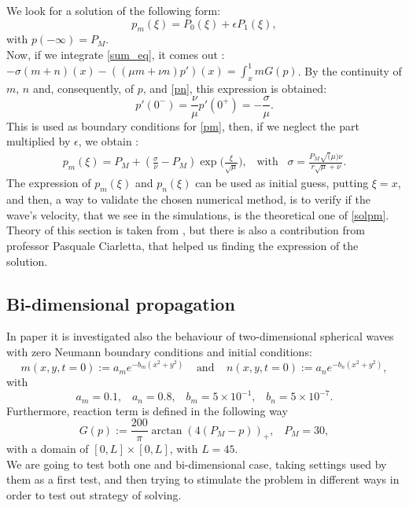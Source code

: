 We look for a solution of the following form: 
\begin{equation}
\label{pm}
p_m(\xi) = P_0(\xi) + \epsilon  P_1 (\xi),
\end{equation}
with $ p(-\infty) = P_M $.\\
Now, if we integrate \eqref{sum_eq}, it comes out : $ -\sigma (m + n) (x) - ((\mu m + \nu n) p')(x) = \int^{1}_{x} mG(p)$. By the continuity of $ m $, $ n $ and, consequently, of $ p $, and \eqref{pn}, this expression is obtained:
\begin{equation*}
p'(0^-) = \frac{\nu}{\mu} p'(0^+)=-\frac{\sigma}{\mu}.
\end{equation*} 
This is used as boundary conditions for \eqref{pm}, then, if we neglect the part multiplied by $ \epsilon $, we obtain :
\begin{eqnarray}
\label{solpm}
p_m(\xi) = P_M + (\frac{\sigma}{\nu} - P_M) \exp \Big({\frac{\xi}{\sqrt{\mu}}}\Big), \; \; \; \text{with} \; \; \;
\sigma = \frac{P_M \sqrt(\mu) \nu}{r\sqrt{\mu} + \nu}.
\end{eqnarray}
The expression of $ p_m(\xi) $ and $ p_n(\xi) $ can be used as initial guess, putting $ \xi = x $, and then, a way to validate the chosen numerical method, is to verify if the wave's velocity, that we see in the simulations, is the theoretical one of \eqref{solpm}.
Theory of this section is taken from \cite{tumor_growth}, but there is also a contribution from professor Pasquale Ciarletta, that helped us finding the expression of the solution.\\
\subsection{Bi-dimensional propagation}
In paper \cite{tumor_growth} it is investigated also the behaviour of two-dimensional spherical waves with zero Neumann boundary conditions and initial conditions:
\begin{equation*}
m(x,y,t=0) := a_m e^{-b_m (x^2 + y^2)} \; \; \; \; \text{and}\; \; \; \; n(x,y,t=0) := a_n e^{-b_n (x^2 + y^2)} ,
\end{equation*}
with 
\begin{equation*}
a_m = 0.1, \; \; \; a_n =0.8, \; \;\; b_m = 5 \times 10^{-1}, \; \; \; b_n = 5 \times 10^{-7}.
\end{equation*}
Furthermore, reaction term is defined in the following way 
\begin{equation*}
G(p):= \frac{200}{\pi}\arctan(4(P_M-p))_+, \;\;\; P_M = 30,
\end{equation*}
with a domain of  $[0, L] \times [0, L]$, with $ L = 45 $.\\
We are going to test both one and bi-dimensional case, taking settings used by them as a first test, and then trying to stimulate the problem in different ways in order to test out strategy of solving. 